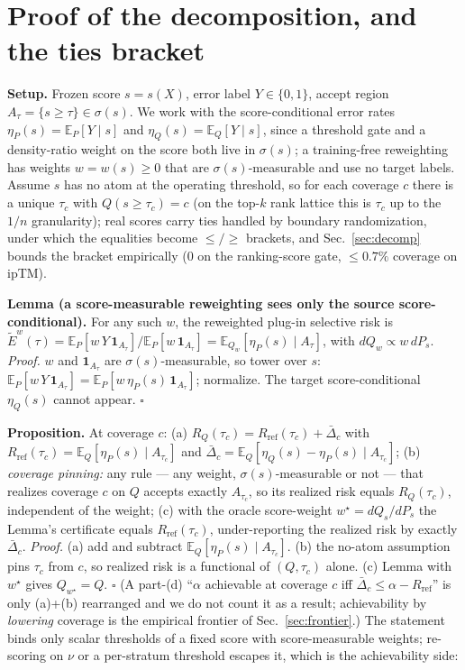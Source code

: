 \documentclass[10pt]{article}
\begin{document}
\appendix
\section{Proof of the decomposition, and the ties bracket}\label{app:proof}
\small
\textbf{Setup.} Frozen score $s=s(X)$, error label $Y\in\{0,1\}$, accept region $A_\tau=\{s\ge\tau\}\in
\sigma(s)$. We work with the score-conditional error rates $\eta_P(s)=\mathbb{E}_P[Y\mid s]$ and
$\eta_Q(s)=\mathbb{E}_Q[Y\mid s]$, since a threshold gate and a density-ratio weight on the score both live
in $\sigma(s)$; a training-free reweighting has weights $w=w(s)\ge0$ that are $\sigma(s)$-measurable and use
no target labels. Assume $s$ has no atom at the operating threshold, so for each coverage $c$ there is a
unique $\tau_c$ with $Q(s\ge\tau_c)=c$ (on the top-$k$ rank lattice this is $\tau_c$ up to the $1/n$
granularity); real scores carry ties handled by boundary randomization, under which the equalities become
$\le/\ge$ brackets, and Sec.~\ref{sec:decomp} bounds the bracket empirically ($0$ on the ranking-score gate,
$\le0.7\%$ coverage on ipTM).

\textbf{Lemma (a score-measurable reweighting sees only the source score-conditional).} For any such $w$,
the reweighted plug-in selective risk is $\widetilde{E}^w(\tau)=\mathbb{E}_P[w\,Y\,\mathbf{1}_{A_\tau}]/
\mathbb{E}_P[w\,\mathbf{1}_{A_\tau}]=\mathbb{E}_{Q_w}[\eta_P(s)\mid A_\tau]$, with $dQ_w\propto w\,dP_s$.
\emph{Proof.} $w$ and $\mathbf{1}_{A_\tau}$ are $\sigma(s)$-measurable, so tower over $s$:
$\mathbb{E}_P[w\,Y\,\mathbf{1}_{A_\tau}]=\mathbb{E}_P[w\,\eta_P(s)\,\mathbf{1}_{A_\tau}]$; normalize. The
target score-conditional $\eta_Q(s)$ cannot appear. $\square$

\textbf{Proposition.} At coverage $c$: (a) $R_Q(\tau_c)=R_{\mathrm{ref}}(\tau_c)+\bar\Delta_c$ with
$R_{\mathrm{ref}}(\tau_c)=\mathbb{E}_Q[\eta_P(s)\mid A_{\tau_c}]$ and $\bar\Delta_c=\mathbb{E}_Q[\eta_Q(s)-
\eta_P(s)\mid A_{\tau_c}]$; (b) \emph{coverage pinning:} any rule --- any weight, $\sigma(s)$-measurable or
not --- that realizes coverage $c$ on $Q$ accepts exactly $A_{\tau_c}$, so its realized risk equals
$R_Q(\tau_c)$, independent of the weight; (c) with the oracle score-weight $w^\star=dQ_s/dP_s$ the Lemma's
certificate equals $R_{\mathrm{ref}}(\tau_c)$, under-reporting the realized risk by exactly $\bar\Delta_c$.
\emph{Proof.} (a) add and subtract $\mathbb{E}_Q[\eta_P(s)\mid A_{\tau_c}]$. (b) the no-atom assumption pins
$\tau_c$ from $c$, so realized risk is a functional of $(Q,\tau_c)$ alone. (c) Lemma with $w^\star$ gives
$Q_{w^\star}=Q$. $\square$ (A part-(d) ``$\alpha$ achievable at coverage $c$ iff $\bar\Delta_c\le\alpha-
R_{\mathrm{ref}}$'' is only (a)+(b) rearranged and we do not count it as a result; achievability by
\emph{lowering} coverage is the empirical frontier of Sec.~\ref{sec:frontier}.) The statement binds only
scalar thresholds of a fixed score with score-measurable weights; re-scoring on $\nu$ or a per-stratum
threshold escapes it, which is the achievability side:
\end{document}

